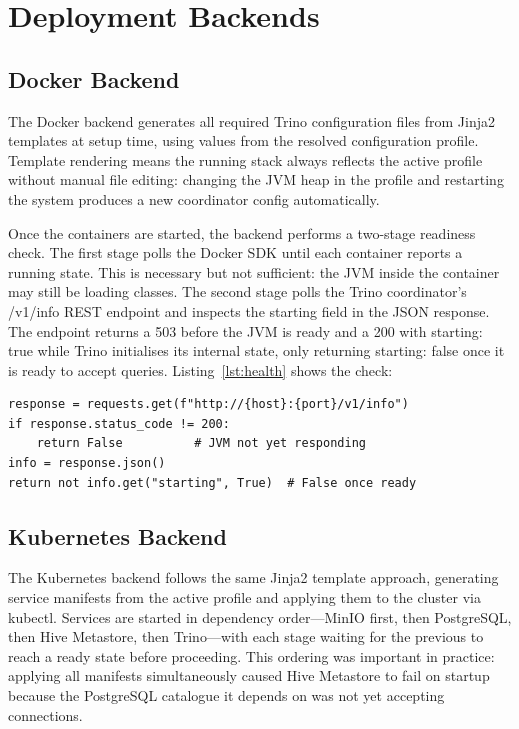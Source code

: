 \documentclass{l4proj}
\begin{document}
\section{Deployment Backends}
\label{sec:impl_systems}

\subsection{Docker Backend}
\label{sec:impl_docker}

The Docker backend generates all required Trino configuration files from Jinja2 templates at setup time, using values from the resolved configuration profile. Template rendering means the running stack always reflects the active profile without manual file editing: changing the JVM heap in the profile and restarting the system produces a new coordinator config automatically.

Once the containers are started, the backend performs a two-stage readiness check. The first stage polls the Docker SDK until each container reports a running state. This is necessary but not sufficient: the JVM inside the container may still be loading classes. The second stage polls the Trino coordinator's /v1/info REST endpoint and inspects the starting field in the JSON response. The endpoint returns a 503 before the JVM is ready and a 200 with starting: true while Trino initialises its internal state, only returning starting: false once it is ready to accept queries. Listing~\ref{lst:health} shows the check:

\begin{lstlisting}[style=pythonstyle, caption={Two-stage Trino readiness check used by the Docker backend.}, label={lst:health}]
response = requests.get(f"http://{host}:{port}/v1/info")
if response.status_code != 200:
    return False          # JVM not yet responding
info = response.json()
return not info.get("starting", True)  # False once ready
\end{lstlisting}

\subsection{Kubernetes Backend}
\label{sec:impl_k8s}

The Kubernetes backend follows the same Jinja2 template approach, generating service manifests from the active profile and applying them to the cluster via kubectl. Services are started in dependency order---MinIO first, then PostgreSQL, then Hive Metastore, then Trino---with each stage waiting for the previous to reach a ready state before proceeding. This ordering was important in practice: applying all manifests simultaneously caused Hive Metastore to fail on startup because the PostgreSQL catalogue it depends on was not yet accepting connections.
\end{document}
